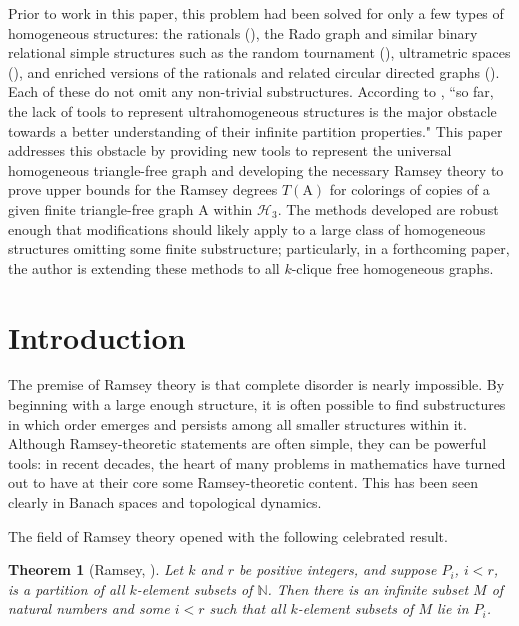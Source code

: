 \documentclass{amsart}
\newtheorem{thm}{Theorem}[section]
\theoremstyle{remark}
\theoremstyle{definition}
\theoremstyle{remark}
\begin{document}
Prior to work in this paper, this problem  had been solved for only a few types of  homogeneous structures: the rationals (\cite{DevlinThesis}), the Rado graph and similar binary relational simple structures such as the random tournament (\cite{Sauer06}), ultrametric spaces (\cite{NVT08}), and
 enriched versions of the rationals and related circular directed graphs (\cite{Laflamme/NVT/Sauer10}).
Each of these do not omit any non-trivial substructures.
According to  \cite{NVTHabil},
``so far, the lack of tools to represent ultrahomogeneous structures is the major obstacle towards a better understanding of their infinite partition properties."
This paper
addresses this obstacle by
providing new tools to represent the universal homogeneous triangle-free graph and developing  the necessary Ramsey theory to prove upper bounds for the Ramsey degrees $T(\mathrm{A})$ for colorings of copies of a given finite triangle-free graph $\mathrm{A}$
within $\mathcal{H}_3$.
The methods  developed are robust
enough that  modifications
should likely apply to
 a large class of homogeneous structures omitting some finite substructure; particularly, in a forthcoming paper, the author is extending these methods to all $k$-clique free homogeneous graphs.







\section{Introduction}


The premise of Ramsey theory is that complete disorder is nearly impossible.
By beginning with a large enough structure, it is often possible to find  substructures in which order emerges
and persists among all smaller structures within it.
Although Ramsey-theoretic  statements are often simple,
they can be powerful tools:
in recent decades, the heart of  many  problems
in mathematics
have turned out to have  at their core some Ramsey-theoretic content.
This has been seen clearly in  Banach spaces and topological dynamics.


The field of Ramsey theory opened with the following celebrated result.
\begin{thm}[Ramsey, \cite{Ramsey30}]\label{thm.RamseyInfinite}
Let $k$ and $r$ be positive integers, and suppose $P_i$,  $i<r$, is a partition of all $k$-element subsets of $\mathbb{N}$.
Then there is an infinite subset $M$ of natural numbers
and some $i<r$
such that all $k$-element subsets of $M$ lie in $P_i$.
\end{thm}
\end{document}
